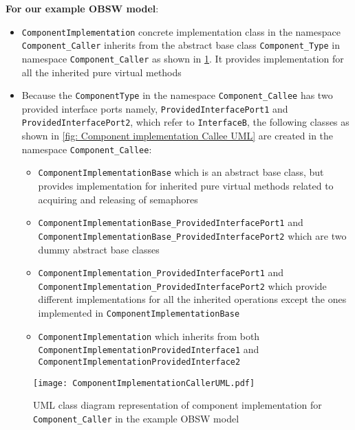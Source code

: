 \textbf{For our example OBSW model}:
\begin{itemize}
\item \texttt{Component\allowbreak Implementation} concrete implementation class in the namespace \texttt{Component\_Caller} inherits from the abstract base class \texttt{Component\_Type} in namespace \texttt{Component\allowbreak\_Caller} as shown in \cref{fig: Component implementation Caller UML}. It provides implementation for all the inherited pure virtual methods
\item Because the \texttt{ComponentType} in the namespace \texttt{Component\_Callee} has two provided interface ports namely, \texttt{Provided\allowbreak Interface\allowbreak Port1} and \texttt{Provided\allowbreak Interface\allowbreak Port2}, which refer to \texttt{InterfaceB}, the following classes as shown in \cref{fig: Component implementation Callee UML} are created in the namespace \texttt{Component\_Callee}:
\begin{itemize}
\item \texttt{ComponentImplementation\allowbreak Base} which is an abstract base class, but provides implementation for inherited pure virtual methods related to acquiring and releasing of semaphores
\item \texttt{Component\allowbreak Implementation\allowbreak Base\_\allowbreak Provided\allowbreak Interface\allowbreak Port1\allowbreak} and \texttt{Component\allowbreak Implementation\allowbreak Base\_\allowbreak Provided\allowbreak Interface\allowbreak Port2\allowbreak} which are two dummy abstract base classes
\item \texttt{Component\allowbreak Implementation\_\allowbreak Provided\allowbreak Interface\allowbreak Port1} and \texttt{Component\allowbreak Impl\allowbreak emen\allowbreak tation\_\allowbreak Provided\allowbreak Interface\allowbreak Port2} which provide different implementations for all the inherited operations except the ones implemented in \texttt{Component\allowbreak Implementation\allowbreak Base}
\item \texttt{Component\allowbreak Implementation} which inherits from both \texttt{Component\allowbreak Implemen\allowbreak tation\allowbreak Provided\allowbreak Interface1} and \texttt{Component\allowbreak Implementation\allowbreak Provided\allowbreak Inter\allowbreak face2}
\end{itemize}   
\end{itemize}

\begin{figure}[h]
	\centering
	\texttt{[image: ComponentImplementationCallerUML.pdf]}
	\caption{UML class diagram representation of component implementation for \texttt{Component\_\allowbreak Caller} in the example OBSW model}
	\label{fig: Component implementation Caller UML}
\end{figure} 

